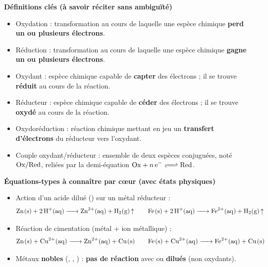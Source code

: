 \documentclass[11pt]{article}
\newcommand{\cle}[1]{{\popxbold\color{popdark}#1}}
\begin{document}
\begin{bilan}
\textbf{Définitions clés (à savoir réciter sans ambiguïté)}
\begin{itemize}
  \item \cle{Oxydation} : transformation au cours de laquelle une espèce chimique \textbf{perd un ou plusieurs électrons}.
  \item \cle{Réduction} : transformation au cours de laquelle une espèce chimique \textbf{gagne un ou plusieurs électrons}.
  \item \cle{Oxydant} : espèce chimique capable de \textbf{capter} des électrons ; il se trouve \textbf{réduit} au cours de la réaction.
  \item \cle{Réducteur} : espèce chimique capable de \textbf{céder} des électrons ; il se trouve \textbf{oxydé} au cours de la réaction.
  \item \cle{Oxydoréduction} : réaction chimique mettant en jeu un \textbf{transfert d'électrons} du réducteur vers l'oxydant.
  \item \cle{Couple oxydant/réducteur} : ensemble de deux espèces conjuguées, noté $\ce{Ox/Red}$, reliées par la demi-équation $\ce{Ox + n e^- <=> Red}$.
\end{itemize}

\textbf{Équations-types à connaître par cœur (avec états physiques)}
\begin{itemize}
  \item Action d'un acide dilué () sur un métal réducteur :
  \[ \ce{Zn(s) + 2H+(aq) -> Zn^2+(aq) + H2(g) ^} \qquad \ce{Fe(s) + 2H+(aq) -> Fe^2+(aq) + H2(g) ^} \]
  \item Réaction de \og cimentation \fg (métal + ion métallique) :
  \[ \ce{Zn(s) + Cu^2+(aq) -> Zn^2+(aq) + Cu(s)} \qquad \ce{Fe(s) + Cu^2+(aq) -> Fe^2+(aq) + Cu(s)} \]
  \item Métaux \textbf{nobles} (, , ) : \textbf{pas de réaction} avec  ou  \textbf{dilués} (non oxydants).
\end{itemize}


\end{bilan}
\end{document}
